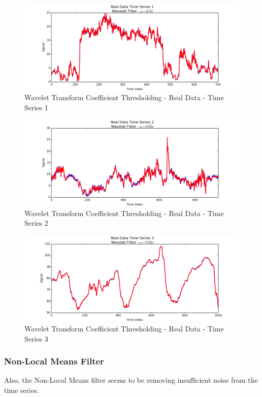 \documentclass[11pt]{article}
\theoremstyle{definition}
\begin{document}
\begin{figure}
\centering
\includegraphics[width = 0.75 \textwidth]{WaveletRealSignal1.png}
\caption{Wavelet Transform Coefficient Thresholding - Real Data - Time Series 1}
\label{waveletrealsignal1}
\end{figure}

\begin{figure}
\centering
\includegraphics[width = 0.75 \textwidth]{WaveletRealSignal2.png}
\caption{Wavelet Transform Coefficient Thresholding - Real Data - Time Series 2}
\label{waveletrealsignal2}
\end{figure}

\begin{figure}
\centering
\includegraphics[width = 0.75 \textwidth]{WaveletRealSignal3.png}
\caption{Wavelet Transform Coefficient Thresholding - Real Data - Time Series 3}
\label{waveletrealsignal3}
\end{figure}

\newpage

\subsubsection{Non-Local Means Filter}

Also, the Non-Local Means filter seems to be removing insufficient noise from the time series.
\end{document}
